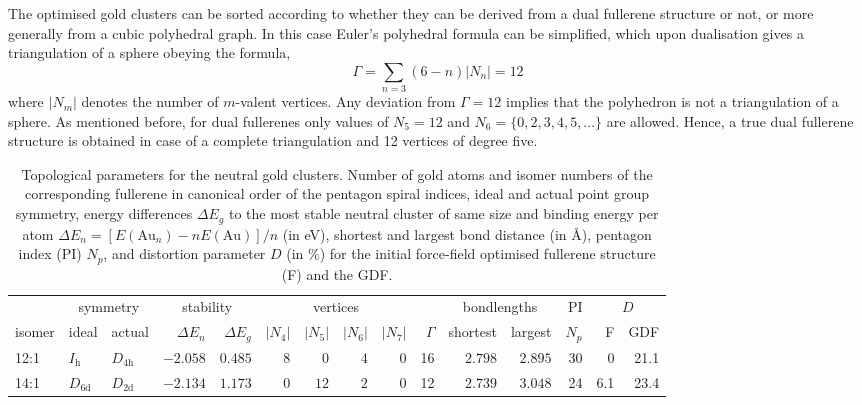 The optimised gold clusters can be sorted according to whether they can be
derived from a dual fullerene structure or not, or more generally from a cubic
polyhedral graph. In this case Euler's polyhedral formula can be simplified,
which upon dualisation gives a triangulation of a sphere obeying the formula,
%
\begin{equation}
\label{eq3valent} 
\Gamma=\sum_{n=3}(6-n)|N_n| = 12
\end{equation}
%
where $|N_m|$ denotes the number of $m$-valent vertices. Any deviation from
$\Gamma=12$ implies that the polyhedron is not a triangulation of a sphere. As mentioned before, for
dual fullerenes only values of $N_5=12$ and $N_6=\{0,2,3,4,5,\dots\}$ are
allowed. Hence, a true dual fullerene structure is obtained in case of a
complete triangulation and 12 vertices of degree five.
%
\begin{table}[htbp]
	\centering
    \setlength{\tabcolsep}{1.5pt}
    \footnotesize{
    \caption{Topological parameters for the neutral gold clusters. Number of
    gold atoms and isomer numbers of the corresponding fullerene in canonical
    order of the pentagon spiral indices,\autocite{Fowler-atlas-2006} ideal and
    actual point group symmetry, energy differences $\Delta E_g$ to the most
    stable neutral cluster of same size and binding energy per atom $\Delta E_n
    = [E(\textrm{Au}_n)-nE(\textrm{Au})]/n$  (in eV), shortest and largest bond
    distance (in \AA), pentagon index (PI) $N_p$, and distortion parameter $D$
    (in \%) for the initial force-field optimised fullerene structure (F) and
    the \acs{GDF}.}
	\label{tab:neutral}
	\begin{tabular}{lllrrrrrrrrrrrr}
\toprule
\multicolumn{1}{c}{  } & \multicolumn{2}{c}{ symmetry  }  & \multicolumn{2}{c}{stability} & \multicolumn{4}{c}{ vertices } & & \multicolumn{2}{c}{ bondlengths } &  PI & \multicolumn{2}{c}{ $D$ } \\
isomer & ideal  & actual  & $\Delta E_n$ &$\Delta E_g$ & \multicolumn{1}{c}{$|N_4|$} & \multicolumn{1}{c}{$|N_5|$} & \multicolumn{1}{c}{$|N_6|$} & \multicolumn{1}{c}{$|N_7|$} & $\Gamma$ & shortest & largest  & $N_p$ & F & GDF\\\midrule
12:1    & $I_\mathrm{h}$  & $D_\mathrm{4h}$ & $-2.058$ & $0.485$  & $8$ & $0$  & $4$      & $0$ & 16  & $2.798$ & $2.895$ & 30  & 0    & 21.1  \\
14:1    & $D_\mathrm{6d}$ & $D_\mathrm{2d}$ & $-2.134$ & $1.173$  & $0$ & $12$ & $2$      & $0$ & 12  & $2.739$ & $3.048$ & 24  & 6.1  & 23.4  \\

\end{tabular}}
\end{table}
